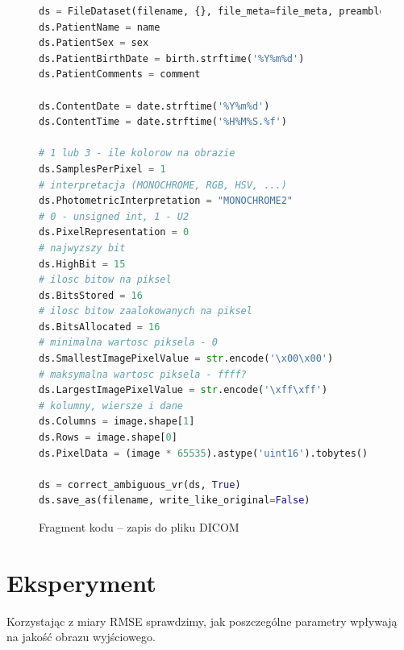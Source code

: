\documentclass[polish,polish,a4paper]{article}
\begin{document}
			\begin{figure}[!h]
				\centering
				\begin{lstlisting}[language=Python, frame=single]
ds = FileDataset(filename, {}, file_meta=file_meta, preamble=b"\0" * 128)
ds.PatientName = name
ds.PatientSex = sex
ds.PatientBirthDate = birth.strftime('%Y%m%d')
ds.PatientComments = comment

ds.ContentDate = date.strftime('%Y%m%d')
ds.ContentTime = date.strftime('%H%M%S.%f')

# 1 lub 3 - ile kolorow na obrazie
ds.SamplesPerPixel = 1
# interpretacja (MONOCHROME, RGB, HSV, ...)
ds.PhotometricInterpretation = "MONOCHROME2"
# 0 - unsigned int, 1 - U2
ds.PixelRepresentation = 0
# najwyzszy bit
ds.HighBit = 15
# ilosc bitow na piksel
ds.BitsStored = 16
# ilosc bitow zaalokowanych na piksel
ds.BitsAllocated = 16
# minimalna wartosc piksela - 0
ds.SmallestImagePixelValue = str.encode('\x00\x00')
# maksymalna wartosc piksela - ffff?
ds.LargestImagePixelValue = str.encode('\xff\xff')
# kolumny, wiersze i dane
ds.Columns = image.shape[1]
ds.Rows = image.shape[0]
ds.PixelData = (image * 65535).astype('uint16').tobytes()

ds = correct_ambiguous_vr(ds, True)
ds.save_as(filename, write_like_original=False)
				\end{lstlisting}
				\caption{Fragment kodu -- zapis do pliku DICOM}
				\label{dicomsave}
			\end{figure}
			
	\section{Eksperyment}
		Korzystając z miary RMSE sprawdzimy, 
		jak poszczególne parametry wpływają na jakość obrazu wyjściowego. 
		
\end{document}
